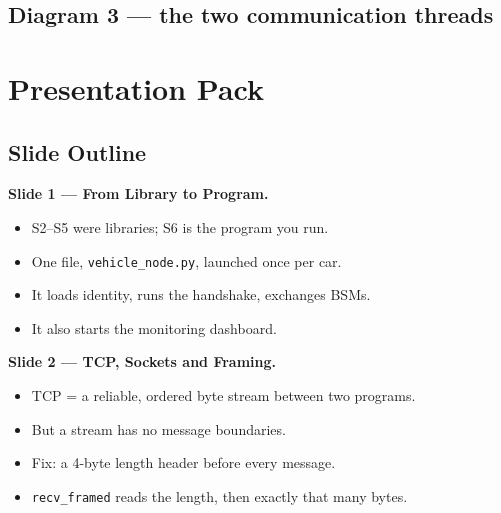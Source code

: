 \documentclass[11pt,a4paper]{article}
\begin{document}
\subsection{Diagram 3 --- the two communication threads}
\begin{center}
\end{center}

\section{Presentation Pack}

\subsection{Slide Outline}

\textbf{Slide 1 --- From Library to Program.}
\begin{itemize}
  \item S2--S5 were libraries; S6 is the program you run.
  \item One file, \texttt{vehicle\_node.py}, launched once per car.
  \item It loads identity, runs the handshake, exchanges BSMs.
  \item It also starts the monitoring dashboard.
\end{itemize}

\textbf{Slide 2 --- TCP, Sockets and Framing.}
\begin{itemize}
  \item TCP = a reliable, ordered byte stream between two programs.
  \item But a stream has no message boundaries.
  \item Fix: a 4-byte length header before every message.
  \item \texttt{recv\_framed} reads the length, then exactly that many bytes.
\end{itemize}
\end{document}
